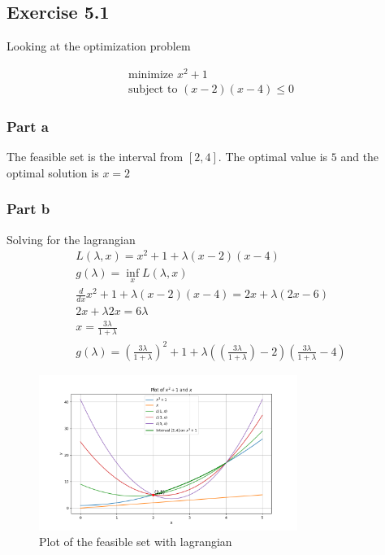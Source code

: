 \subsection{Exercise 5.1}
Looking at the optimization problem

\begin{equation}
  \begin{aligned}
    \text{minimize } x^2 +1 \\
    \text{subject to } (x-2)(x-4) \leq 0
  \end{aligned}
\end{equation}
\subsubsection{Part a}
The feasible set is the interval from $[2,4]$. The optimal value is $5$ and the optimal solution is $x=2$ 

\subsubsection{Part b}
Solving for the lagrangian
\begin{equation}
  \begin{aligned}
    L(\lambda, x) = x^2+1 + \lambda (x-2)(x-4) \\
    g(\lambda) = \inf_x L(\lambda, x) \\
    \frac{d }{d x} x^2+1 + \lambda(x-2)(x-4) = 2x + \lambda(2x -6) \\
    2x + \lambda 2x = 6\lambda \\
    x = \frac{3\lambda}{1+\lambda} \\ 
    g(\lambda) = (\frac{3\lambda}{1+\lambda})^2 + 1 + \lambda( (\frac{3\lambda}{1+\lambda}) -2 )(\frac{3\lambda}{1+\lambda} -4)
  \end{aligned}
\end{equation}

\begin{figure}[htbp]
  \centerline{\includegraphics[width=0.75\textwidth]{hw4/5_1_part_b_1.png}}
  \caption{Plot of the feasible set with lagrangian}
  \label{fig:5_1_b_1}
\end{figure}

